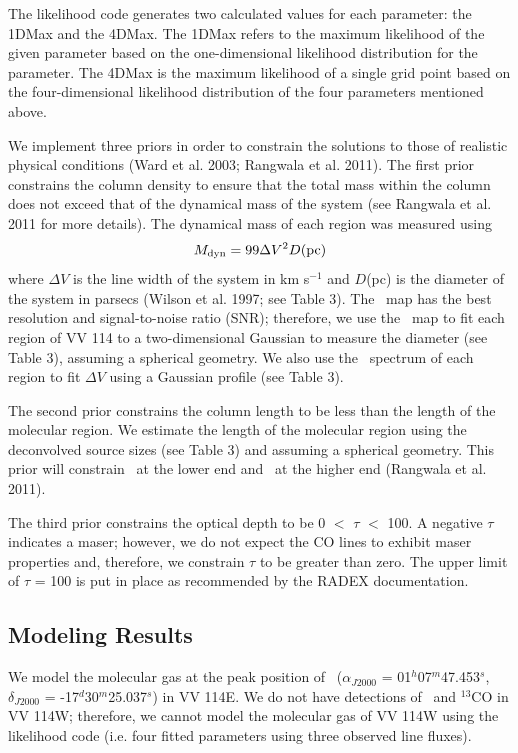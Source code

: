 The likelihood code generates two calculated values for each parameter: the 1DMax and the 4DMax. The 1DMax refers to the maximum likelihood of the given parameter based on the one-dimensional likelihood distribution for the parameter. The 4DMax is the maximum likelihood of a single grid point based on the four-dimensional likelihood distribution of the four parameters mentioned above. 

We implement three priors in order to constrain the solutions to those of realistic physical conditions (Ward et al. 2003; Rangwala et al. 2011). The first prior constrains the column density to ensure that the total mass within the column does not exceed that of the dynamical mass of the system (see Rangwala et al. 2011 for more details). The dynamical mass of each region was measured using
\begin{equation}
M_{\rm{dyn}} = 99\Delta V^{2} D\rm{(pc)}
\end{equation}
where $\Delta V$ is the line width of the system in km s$^{-1}$ and $D$(pc) is the diameter of the system in parsecs (Wilson et al. 1997; see Table 3)\nocite{1997ApJ...483..210W}. The \cothree\ map has the best resolution and signal-to-noise ratio (SNR); therefore, we use the \cothree\ map to fit each region of VV 114 to a two-dimensional Gaussian to measure the diameter (see Table 3), assuming a spherical geometry. We also use the \cothree\ spectrum of each region to fit $\Delta V$ using a Gaussian profile (see Table 3). 

The second prior constrains the column length to be less than the length of the molecular region. We estimate the length of the molecular region using the deconvolved source sizes (see Table 3) and assuming a spherical geometry. This prior will constrain \nhtwo\ at the lower end and \nco\ at the higher end (Rangwala et al. 2011). 

The third prior constrains the optical depth to be 0 $<$ $\tau$ $<$ 100. A negative $\tau$ indicates a maser; however, we do not expect the CO lines to exhibit maser properties and, therefore, we constrain $\tau$ to be greater than zero. The upper limit of $\tau$ = 100 is put in place as recommended by the RADEX documentation. 

\subsection{Modeling Results}%
We model the molecular gas at the peak position of \cothree\ ($\alpha_{J2000}$ = 01$^{h}$07$^{m}$47.453$^{s}$,  $\delta_{J2000}$ = -17$^{d}$30$^{m}$25.037$^{s}$) in VV 114E. We do not have detections of \cosix\ and $^{13}$CO in VV 114W; therefore, we cannot model the molecular gas of VV 114W using the likelihood code (i.e. four fitted parameters using three observed line fluxes).  

